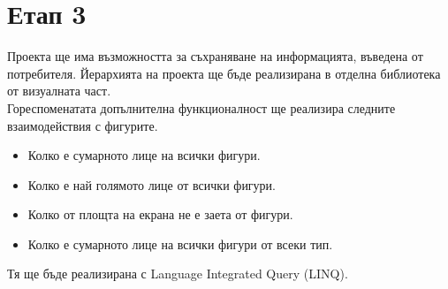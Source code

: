 \documentclass[a4paper,fleqn,12pt]{article}
\begin{document}
\section{Етап 3}
Проекта ще има възможността за съхраняване на информацията, въведена от потребителя. 
Йерархията на проекта ще бъде реализирана в отделна библиотека от визуалната част. \\
Гореспоменатата допълнителна функционалност ще реализира следните взаимодействия с фигурите.
\begin{itemize}
\item Колко е сумарното лице на всички фигури. 
\item Колко е най голямото лице от всички фигури.
\item Колко от площта на екрана не е заета от фигури. 
\item Колко е сумарното лице на всички фигури от всеки тип. 
\end{itemize}
Тя ще бъде реализирана с Language Integrated Query (LINQ).
\end{document}
